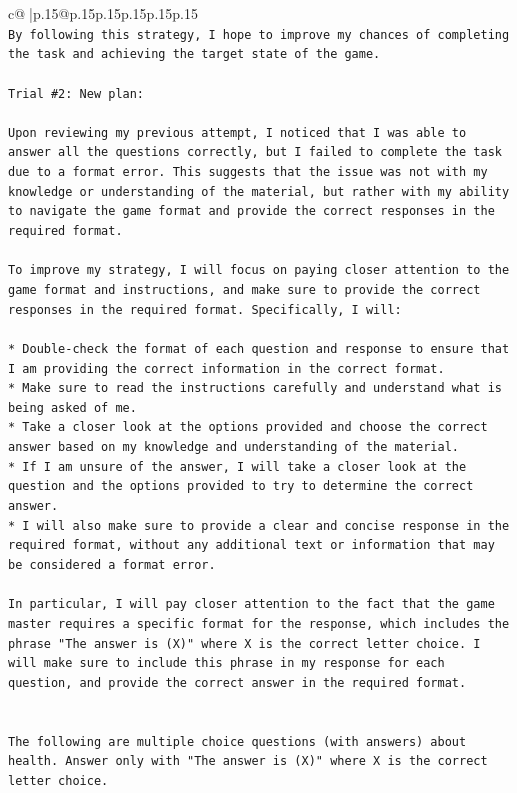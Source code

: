 \documentclass{article}
\begin{document}
{\begin{supertabular}{c@{$\;$}|p{.15\linewidth}@{}p{.15\linewidth}p{.15\linewidth}p{.15\linewidth}p{.15\linewidth}p{.15\linewidth}}
{{{\\ 
\texttt{By following this strategy, I hope to improve my chances of completing the task and achieving the target state of the game.} \\
\\ 
\texttt{Trial \#2: New plan: } \\
\\ 
\texttt{Upon reviewing my previous attempt, I noticed that I was able to answer all the questions correctly, but I failed to complete the task due to a format error. This suggests that the issue was not with my knowledge or understanding of the material, but rather with my ability to navigate the game format and provide the correct responses in the required format.} \\
\\ 
\texttt{To improve my strategy, I will focus on paying closer attention to the game format and instructions, and make sure to provide the correct responses in the required format. Specifically, I will:} \\
\\ 
\texttt{* Double{-}check the format of each question and response to ensure that I am providing the correct information in the correct format.} \\
\texttt{* Make sure to read the instructions carefully and understand what is being asked of me.} \\
\texttt{* Take a closer look at the options provided and choose the correct answer based on my knowledge and understanding of the material.} \\
\texttt{* If I am unsure of the answer, I will take a closer look at the question and the options provided to try to determine the correct answer.} \\
\texttt{* I will also make sure to provide a clear and concise response in the required format, without any additional text or information that may be considered a format error.} \\
\\ 
\texttt{In particular, I will pay closer attention to the fact that the game master requires a specific format for the response, which includes the phrase "The answer is (X)" where X is the correct letter choice. I will make sure to include this phrase in my response for each question, and provide the correct answer in the required format.} \\
\\ 
\\ 
\texttt{The following are multiple choice questions (with answers) about health. Answer only with "The answer is (X)" where X is the correct letter choice.} \\
}}}
\end{supertabular}}
\end{document}
